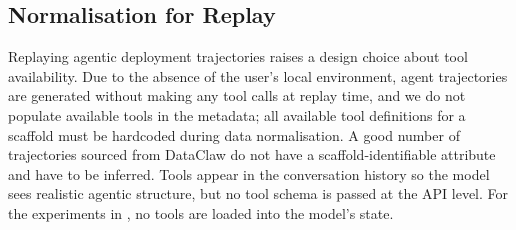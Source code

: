 \documentclass{article}
\begin{document}
\subsection{Normalisation for Replay}
\label{sec:appendix_replay}

Replaying agentic deployment trajectories raises a design choice about
tool availability. Due to the absence of the user's local environment,
agent trajectories are generated without making any tool calls at
replay time, and we do not populate available tools in the metadata;
all available tool definitions for a scaffold must be hardcoded during
data normalisation. A good number of trajectories sourced from
DataClaw do not have a scaffold-identifiable attribute and have to be
inferred. Tools appear in the conversation history so the model sees
realistic agentic structure, but no tool schema is passed at the API
level. For the experiments in , no tools are
loaded into the model's state.

\newpage
% 
\end{document}
